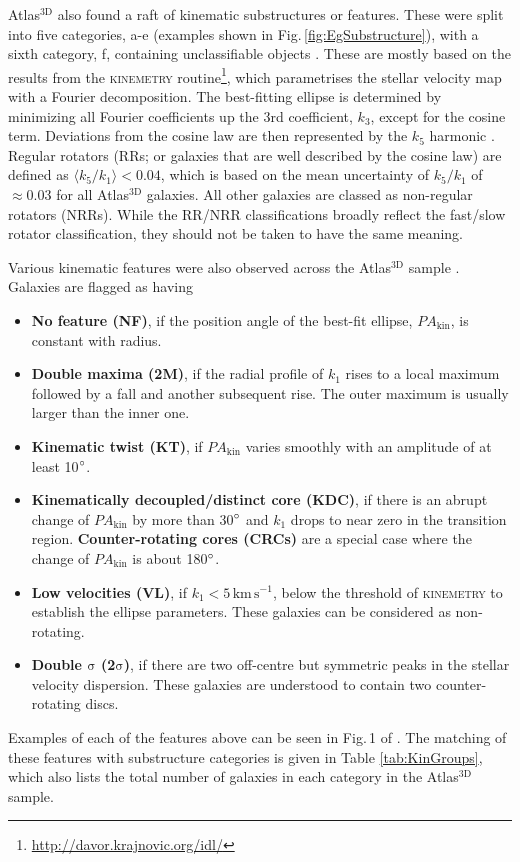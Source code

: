 	Atlas$^\text{3D}$ also found a raft of kinematic substructures or features. These were split into five categories, a-e (examples shown in Fig.\,\ref{fig:EgSubstructure}), with a sixth category, f, containing unclassifiable objects \citep{Krajnovic2011}. These are mostly based on the results from the \textsc{kinemetry} routine\footnote{\url{http://davor.krajnovic.org/idl/}}\citep{Krajnovic2006}, which parametrises the stellar velocity map with a Fourier decomposition. The best-fitting ellipse is determined by minimizing all Fourier coefficients up the 3rd coefficient, $k_3$, except for the cosine term. Deviations from the cosine law are then represented by the $k_5$ harmonic \citep{Krajnovic2006}. Regular rotators (RRs; or galaxies that are well described by the cosine law) are defined as $\langle k_5/k_1 \rangle < 0.04$, which is based on the mean uncertainty of $k_5/k_1$ of $\approx 0.03$ for all Atlas$^\text{3D}$ galaxies. All other galaxies are classed as non-regular rotators (NRRs). While the RR/NRR classifications broadly reflect the fast/slow rotator classification, they should not be taken to have the same meaning. 

	Various kinematic features were also observed across the Atlas$^\text{3D}$ sample \citep{Krajnovic2011}. Galaxies are flagged as having
	\begin{itemize}
		\item \textbf{No feature (NF)}, if the position angle of the best-fit ellipse, $PA_\mathrm{kin}$, is constant with radius.
		\item \textbf{Double maxima (2M)}, if the radial profile of $k_1$ rises to a local maximum followed by a fall and another subsequent rise. The outer maximum is usually larger than the inner one. 
		\item \textbf{Kinematic twist (KT)}, if $PA_\mathrm{kin}$ varies smoothly with an amplitude of at least 10$\degree$. 
		\item \textbf{Kinematically decoupled/distinct core (KDC)}, if there is an abrupt change of $PA_\mathrm{kin}$ by more than 30$\degree$ and $k_1$ drops to near zero in the transition region. \textbf{Counter-rotating cores (CRCs)} are a special case where the change of $PA_\mathrm{kin}$ is about 180$\degree$.
		\item \textbf{Low velocities (VL)}, if $k_1 < 5 \, \mathrm{km \, s^{-1}}$, below the threshold of \textsc{kinemetry} to establish the ellipse parameters. These galaxies can be considered as non-rotating.
		\item \textbf{Double $\mathrm{\sigma}$ (2$\mathrm{\sigma}$)}, if there are two off-centre but symmetric peaks in the stellar velocity dispersion. These galaxies are understood to contain two counter-rotating discs. 
	\end{itemize}
	Examples of each of the features above can be seen in Fig.\,1 of \citet{Krajnovic2011}. The matching of these features with substructure categories is given in Table \ref{tab:KinGroups}, which also lists the total number of galaxies in each category in the Atlas$^\text{3D}$ sample. 


